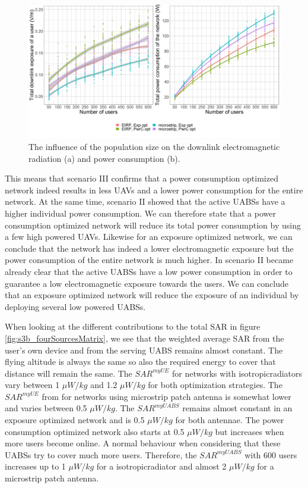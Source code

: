 \begin{figure}[h!]
  \includegraphics[width=\textwidth]{../results/s3/uvsdlAndPc.png}
  \caption{The influence of the population size on the downlink electromagnetic radiation (a) and power consumption (b).}
  \label{fig:s3b_dlAndPC}
\end{figure}


This means that scenario III confirms that a power consumption optimized network indeed results in less \gls{UAV}s and a lower 
 power consumption for the entire network. 
At the same time, scenario II showed that the active \gls{UABS}s have a higher individual power consumption.
We can therefore state that a power consumption optimized network will reduce its total power consumption by
using a few high powered \gls{UAV}s.
Likewise for an exposure optimized network, we can conclude that the network has indeed a lower electromagnetic exposure but the power consumption 
of the entire network is much higher. In scenario II became already clear that the active \gls{UABS}s have a low power consumption in order to 
guarantee a low electromagnetic exposure towards the users.
We can conclude that an exposure optimized network will reduce the exposure of an individual 
by deploying several low powered \gls{UABS}s.

When looking at the different contributions to the total \gls{SAR} in figure \ref{fig:s3b_fourSourcesMatrix}, 
we see that the weighted average 
\gls{SAR} from the user's own device and from the serving \gls{UABS} remains almost constant. The flying altitude is always the same so 
also the required energy to cover that distance will remain the same. 
The $SAR^{myUE}$ for networks with \gls{isotropicradiator}s vary between 1 $\mu W/kg$ and 1.2 $\mu W/kg$ for both optimization strategies.
The $SAR^{myUE}$ from for networks using microstrip patch antenna is somewhat lower and varies between 0.5 $\mu W/kg$.
The $SAR^{myUABS}$ remains almost constant in an exposure optimized network and is 0.5 $\mu W/kg$ for both antennae.
The power consumption optimized network also starts at 0.5 $\mu W/kg$ but increases when more users become online. 
A normal behaviour when considering that these \gls{UABS}s try to cover much more users. Therefore, the $SAR^{myUABS}$ 
with 600 users increases up to 1 $\mu W/kg$ for a \gls{isotropicradiator} and almost 2 $\mu W/kg$ for a microstrip patch antenna.

